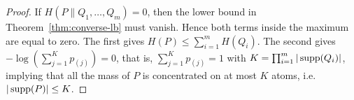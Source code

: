 \documentclass[journal]{IEEEtran}
\def\supp{\mathop{\rm supp}}
\newcommand{\1}{\mathbf{1}}
\begin{document}
\begin{proof}
If $H(P\|Q_1,\dots,Q_m)=0$, then the lower bound in Theorem~\ref{thm:converse-lb} must vanish. Hence both terms inside the maximum are equal to zero. The first gives
$H(P)\le \sum_{i=1}^m H(Q_i)$. The second gives
$-\log(\sum_{j=1}^{K} p_{(j)})=0$, that is, $\sum_{j=1}^{K} p_{(j)}=1$ with $K = \prod_{i=1}^m |\supp(Q_i)|$, implying that all the mass of $P$ is concentrated on at most $K$ atoms, i.e. $|\supp(P)|\le K$. 
\end{proof}
\end{document}
